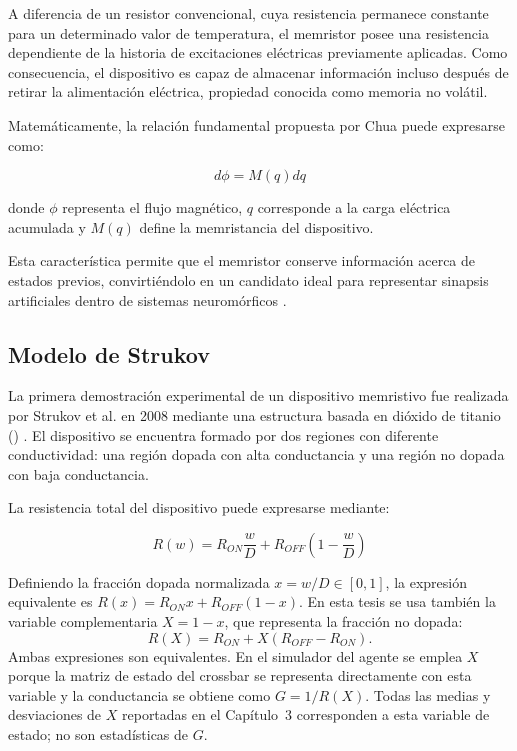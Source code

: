 A diferencia de un resistor convencional, cuya resistencia permanece constante para un determinado valor de temperatura, el memristor posee una resistencia dependiente de la historia de excitaciones eléctricas previamente aplicadas. Como consecuencia, el dispositivo es capaz de almacenar información incluso después de retirar la alimentación eléctrica, propiedad conocida como memoria no volátil.

Matemáticamente, la relación fundamental propuesta por Chua puede expresarse como:

\begin{equation}
d\phi=M(q)dq
\end{equation}

donde $\phi$ representa el flujo magnético, $q$ corresponde a la carga eléctrica acumulada y $M(q)$ define la memristancia del dispositivo.

Esta característica permite que el memristor conserve información acerca de estados previos, convirtiéndolo en un candidato ideal para representar sinapsis artificiales dentro de sistemas neuromórficos \cite{17,26}.

\subsection{Modelo de Strukov}
\label{sec:convenciones_estado}

La primera demostración experimental de un dispositivo memristivo fue realizada por Strukov et al. en 2008 mediante una estructura basada en dióxido de titanio () \cite{26}. El dispositivo se encuentra formado por dos regiones con diferente conductividad: una región dopada con alta conductancia y una región no dopada con baja conductancia.

La resistencia total del dispositivo puede expresarse mediante:

\begin{equation}
R(w)=R_{ON}\frac{w}{D}+R_{OFF}\left(1-\frac{w}{D}\right)
\end{equation}

Definiendo la fracción dopada normalizada $x=w/D\in[0,1]$, la expresión
equivalente es $R(x)=R_{ON}x+R_{OFF}(1-x)$. En esta tesis se usa también
la variable complementaria $X=1-x$, que representa la fracción no dopada:
\[
R(X)=R_{ON}+X(R_{OFF}-R_{ON}).
\]
Ambas expresiones son equivalentes. En el simulador del agente se emplea
$X$ porque la matriz de estado del crossbar se representa directamente con
esta variable y la conductancia se obtiene como $G=1/R(X)$. Todas las medias
y desviaciones de $X$ reportadas en el Capítulo~3 corresponden a esta
variable de estado; no son estadísticas de $G$.


